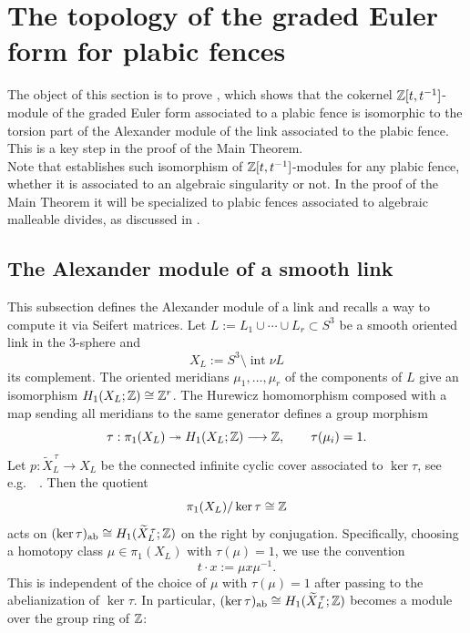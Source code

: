 \section{The topology of the graded Euler form for plabic fences}\label{sec:polynomial_plabic_fence}

The object of this section is to prove , which shows that the cokernel $\mathbb Z[t,t^{-1}]$-module of the graded Euler form associated to a plabic fence is isomorphic to the torsion part of the Alexander module of the link associated to the plabic fence. This is a key step in the proof of the Main Theorem.\\

Note that  establishes such isomorphism of $\mathbb Z[t,t^{-1}]$-modules for any plabic fence, whether it is associated to an algebraic singularity or not. In the proof of the Main Theorem it will be specialized to plabic fences associated to algebraic malleable divides, as discussed in .


\subsection{The Alexander module of a smooth link}\label{ssec:Alexander_modules} This subsection defines the Alexander module of  a link and recalls a way to compute it via Seifert matrices. Let $L:=L_1\cup\cdots\cup L_r\subset S^3$ be a smooth oriented link in the 3-sphere and
\[
   X_L:=S^3\setminus\operatorname{int}\nu L
\]
its complement. The oriented meridians $\mu_{1},\ldots,\mu_{r}$ of the components of $L$ give an isomorphism $H_1(X_L;\mathbb Z)\cong \mathbb Z^r$. The Hurewicz homomorphism composed with a map sending all meridians to the same generator defines a group morphism
\[
   \tau:\pi_1(X_L)\twoheadrightarrow H_1(X_L;\mathbb Z)
   \longrightarrow\mathbb Z,
   \qquad
   \tau(\mu_i)=1.
\]
Let $p:\widetilde X_L^{\,\tau}\longrightarrow X_L$ be the connected infinite cyclic cover associated to $\ker\tau$, see e.g.~~\cite[Chapter 6]{lickorish1997introduction}. Then the quotient
\[
   \pi_1(X_L)/\ker\tau\cong\mathbb Z
\]
acts on $(\ker\tau)_{\mathrm{ab}}\cong H_1(\widetilde X_L^{\,\tau};\mathbb Z)$ on the right by conjugation. Specifically, choosing a homotopy class $\mu\in\pi_1(X_L)$ with $\tau(\mu)=1$, we use the convention
\begin{equation}\label{eq:right-action}
t\cdot x:=\mu x\mu^{-1}.
\end{equation}
This is independent of the choice of $\mu$ with $\tau(\mu)=1$ after passing to the abelianization of $\ker\tau$. In particular, $(\ker\tau)_{\mathrm{ab}}\cong H_1(\widetilde X_L^{\,\tau};\mathbb Z)$ becomes a module over the group ring of $\mathbb Z$:  

